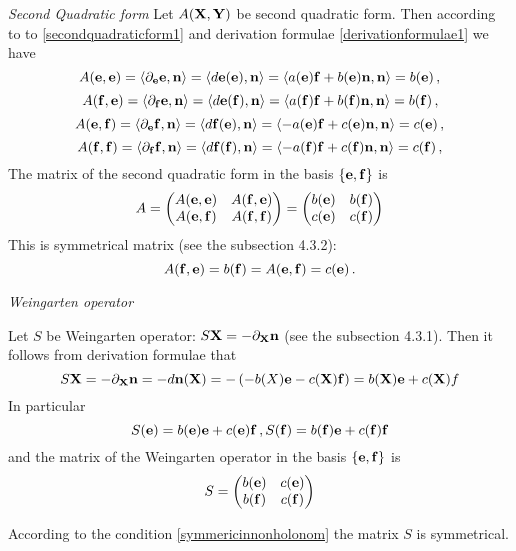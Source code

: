 \documentclass[12pt]{article}
\theoremstyle{theorem}
\numberwithin{equation}{section}
\begin{document}
\m
{\it Second Quadratic form}
  Let $A({\bf X},{\bf Y})$ be second quadratic form. Then according to
  to \eqref{secondquadraticform1} and derivation formulae \eqref{derivationformulae1} we have
               $$
  A({\bf e},{\bf e})=\langle\partial_{\bf e}{\bf e},{\bf n}\rangle=\langle d{\bf e}({\bf e}),{\bf n}\rangle=\langle a({\bf e}){\bf f}+b({\bf e}){\bf n},{\bf n}\rangle=b({\bf e})\,,
               $$
         $$
   A({\bf f},{\bf e})=\langle\partial_{\bf f}{\bf e},{\bf n}\rangle=\langle d{\bf e}({\bf f}),{\bf n}\rangle=\langle a({\bf f}){\bf f}+b({\bf f}){\bf n},{\bf n}\rangle=b({\bf f})\,,
         $$
         $$
     A({\bf e},{\bf f})=\langle\partial_{\bf e}{\bf f},{\bf n}\rangle=\langle d{\bf f}({\bf e}),{\bf n}\rangle=\langle -a({\bf e}){\bf f}+c({\bf e}){\bf n},{\bf n}\rangle=c({\bf e})\,,
           $$
           $$
           A({\bf f},{\bf f})=\langle\partial_{\bf f}{\bf f},{\bf n}\rangle=\langle d{\bf f}({\bf f}),{\bf n}\rangle=\langle -a({\bf f}){\bf f}+c({\bf f}){\bf n},{\bf n}\rangle=c({\bf f})\,,
           $$
     The matrix of the second quadratic form in the basis $\{{\bf e},{\bf f}\}$ is
     \begin{equation}\label{inducedquadrforminnonholonombasis}
        A=
        \begin{pmatrix}
        A({\bf e},{\bf e})& A({\bf f},{\bf e})\cr
        A({\bf e},{\bf f})& A({\bf f},{\bf f})\cr
        \end{pmatrix}
        =
        \begin{pmatrix}
        b({\bf e})&  b({\bf f})\cr
        c({\bf e})& c({\bf f})\cr
        \end{pmatrix}
     \end{equation}
 This is symmetrical matrix (see the subsection 4.3.2):
            \begin{equation}\label{symmericinnonholonom}
 A({\bf f},{\bf e})=b({\bf f})=A({\bf e},{\bf f})=c({\bf e})\,.
            \end{equation}

\m
{\it Weingarten operator}

Let $S$ be Weingarten operator: $S{\bf X}=-\partial_{\bf X}{\bf n}$ (see the subsection 4.3.1). Then
it follows from derivation formulae that
                  $$
     S{\bf X}=-\partial_{\bf X}{\bf n}=-d{\bf n}({\bf X})=-\left(-b(X){\bf e}-c({\bf X}){\bf f}\right)=b({\bf X}){\bf e}+c({\bf X})f
                  $$
In particular
 \begin{equation*}\label{inducedweingartenoperator}
    S({\bf e})=b({\bf e}){\bf e}+c({\bf e}){\bf f}\,, S({\bf f})=b({\bf f}){\bf e}+c({\bf f}){\bf f}
\end{equation*}
and the matrix of the Weingarten operator in the basis $\{{\bf e},{\bf f}\}$ is
\begin{equation}\label{inducedweingartenoperator}
S=
\begin{pmatrix}
b({\bf e})  &c({\bf e})\cr
b({\bf f})  &c({\bf f})\cr
\end{pmatrix}
\end{equation}

According to the condition \eqref{symmericinnonholonom}  the matrix $S$ is symmetrical.
\end{document}
